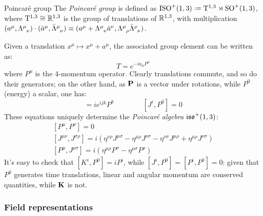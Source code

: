 \begin{definition}{Poincaré group}{}
  The \textit{Poincaré group} is defined as $ \pog \defeq \mathrm{T}^{1,3} \rtimes \lorg $, where $ \mathrm{T}^{1,3} \cong \mathbb{R}^{1,3} $ is the group of translations of $ \mathbb{R}^{1,3} $, with multiplication $ (a^\mu, \tensor{\Lambda}{^\mu_\nu}) \cdot (\bar{a}^\mu, \tensor{\bar{\Lambda}}{^\mu_\nu}) \equiv (a^\mu + \tensor{\Lambda}{^\mu_\nu} \bar{a}^\nu, \tensor{\Lambda}{^\mu_\rho} \tensor{\bar{\Lambda}}{^\rho_\nu}) $.
\end{definition}

Given a translation $ x^\mu \mapsto x^\mu + a^\mu $, the associated group element can be written as:
\begin{equation}
  T = e^{-i a_\mu P^\mu}
  \label{eq:1.53}
\end{equation}
where $ P^\mu $ is the 4-momentum operator. Clearly translations commute, and so do their generators; on the other hand, as $ \mathbf{P} $ is a vector under rotations, while $ P^0 $ (energy) a scalar, one has:
\begin{equation*}
  [J^i,P^j] = i e^{ijk} P^k
  \qquad \qquad
  [J^i,P^0] = 0
\end{equation*}
These equations uniquely determine the \textit{Poincaré algebra} $ \mathfrak{iso}^+(1,3) $:
\begin{equation}
  \begin{gathered}
    [P^\mu,P^\nu] = 0 \\
    [J^{\mu \nu}, J^{\sigma \rho}] = i \left( \eta^{\nu \rho} J^{\mu \sigma} - \eta^{\mu \rho} J^{\nu \sigma} - \eta^{\nu \sigma} J^{\mu \rho} + \eta^{\mu \rho} J^{\nu \sigma} \right) \\
    [P^\mu,J^{\rho \sigma}] = i \left( \eta^{\mu \rho} P^\sigma - \eta^{\mu \sigma} P^\rho \right)
  \end{gathered}
  \label{eq:1.54}
\end{equation}
It's easy to check that $ [K^i,P^0] = i P^i $, while $ [J^i,P^0] = [P^i,P^0] = 0 $: given that $ P^0 $ generates time translations, linear and angular momentum are conserved quantities, while $ \mathbf{K} $ is not.

\subsubsection{Field representations}

